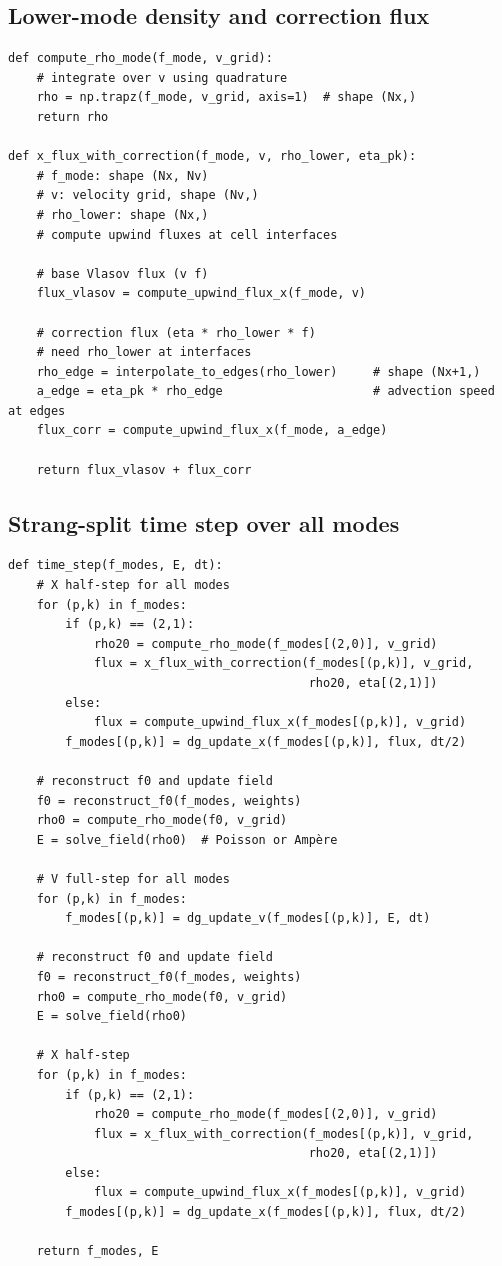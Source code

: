 \documentclass[11pt]{article}
\begin{document}
\subsection{Lower-mode density and correction flux}

\begin{verbatim}
def compute_rho_mode(f_mode, v_grid):
    # integrate over v using quadrature
    rho = np.trapz(f_mode, v_grid, axis=1)  # shape (Nx,)
    return rho

def x_flux_with_correction(f_mode, v, rho_lower, eta_pk):
    # f_mode: shape (Nx, Nv)
    # v: velocity grid, shape (Nv,)
    # rho_lower: shape (Nx,)
    # compute upwind fluxes at cell interfaces

    # base Vlasov flux (v f)
    flux_vlasov = compute_upwind_flux_x(f_mode, v)

    # correction flux (eta * rho_lower * f)
    # need rho_lower at interfaces
    rho_edge = interpolate_to_edges(rho_lower)     # shape (Nx+1,)
    a_edge = eta_pk * rho_edge                     # advection speed at edges
    flux_corr = compute_upwind_flux_x(f_mode, a_edge)

    return flux_vlasov + flux_corr
\end{verbatim}

\subsection{Strang-split time step over all modes}

\begin{verbatim}
def time_step(f_modes, E, dt):
    # X half-step for all modes
    for (p,k) in f_modes:
        if (p,k) == (2,1):
            rho20 = compute_rho_mode(f_modes[(2,0)], v_grid)
            flux = x_flux_with_correction(f_modes[(p,k)], v_grid,
                                          rho20, eta[(2,1)])
        else:
            flux = compute_upwind_flux_x(f_modes[(p,k)], v_grid)
        f_modes[(p,k)] = dg_update_x(f_modes[(p,k)], flux, dt/2)

    # reconstruct f0 and update field
    f0 = reconstruct_f0(f_modes, weights)
    rho0 = compute_rho_mode(f0, v_grid)
    E = solve_field(rho0)  # Poisson or Ampère

    # V full-step for all modes
    for (p,k) in f_modes:
        f_modes[(p,k)] = dg_update_v(f_modes[(p,k)], E, dt)

    # reconstruct f0 and update field
    f0 = reconstruct_f0(f_modes, weights)
    rho0 = compute_rho_mode(f0, v_grid)
    E = solve_field(rho0)

    # X half-step
    for (p,k) in f_modes:
        if (p,k) == (2,1):
            rho20 = compute_rho_mode(f_modes[(2,0)], v_grid)
            flux = x_flux_with_correction(f_modes[(p,k)], v_grid,
                                          rho20, eta[(2,1)])
        else:
            flux = compute_upwind_flux_x(f_modes[(p,k)], v_grid)
        f_modes[(p,k)] = dg_update_x(f_modes[(p,k)], flux, dt/2)

    return f_modes, E
\end{verbatim}
\end{document}
